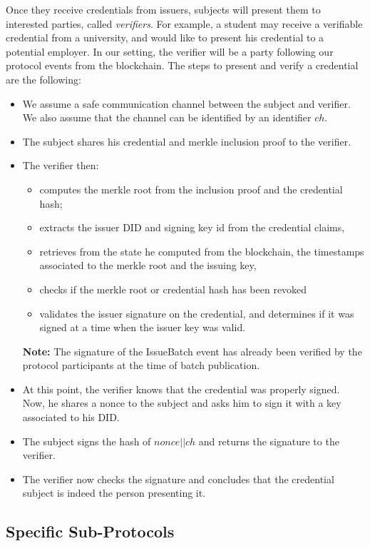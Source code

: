 \documentclass[10pt,a4paper]{article}
\begin{document}
Once they receive credentials from issuers, subjects will present them to interested parties, called \emph{verifiers}. For example, a student may receive a verifiable credential from a university, and would like to present his credential to a potential employer. In our setting, the verifier will be a party following our protocol events from the blockchain. The steps to present and verify a credential are the following:
\begin{itemize}
\item We assume a safe communication channel between the subject and verifier.
      We also assume that the channel can be identified by an identifier $ch$.
\item The subject shares his credential and merkle inclusion proof to the verifier.
\item The verifier then: 
	\begin{itemize}
	\item computes the merkle root from the inclusion proof and the credential hash;
	\item extracts the issuer DID and signing key id from the credential claims,
	\item retrieves from the state he computed from the blockchain, the timestamps associated to the merkle root and the issuing key, 
	\item checks if the merkle root or credential hash has been revoked
	\item validates the issuer signature on the credential, and determines if it was signed at a time when the issuer key was valid.
	\end{itemize}
  \textbf{Note:} The signature of the IssueBatch event has already been verified by the protocol participants at the time of batch publication. 
\item At this point, the verifier knows that the credential was properly signed. Now, he shares a nonce to the subject and asks him to sign it with a key associated to his DID.
\item The subject signs the hash of $nonce || ch$ and returns the signature to the verifier.
\item The verifier now checks the signature and concludes that the credential subject is indeed the person presenting it.
\end{itemize}

\subsection{Specific Sub-Protocols}
\label{ssec:subproto}
\end{document}
